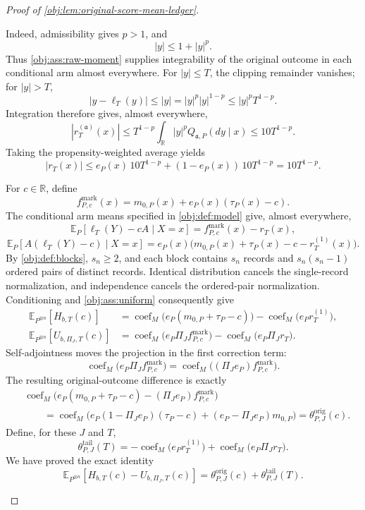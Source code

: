 \documentclass[11pt]{article}
\begin{document}
\begin{proof}[Proof of \cref{obj:lem:original-score-mean-ledger}]
\begin{enumerate}
Indeed, admissibility gives \(p>1\), and
\[
|y|\le1+|y|^p.
\]
Thus \cref{obj:ass:raw-moment} supplies integrability of the original outcome in each conditional arm almost everywhere. For \(|y|\le T\), the clipping remainder vanishes; for \(|y|>T\),
\[
|y-\ell_T(y)|
\le |y|
=|y|^p|y|^{1-p}
\le |y|^pT^{1-p}.
\]
Integration therefore gives, almost everywhere,
\[
|r_T^{(\mathfrak a)}(x)|
\le
T^{1-p}\int_{\mathbb R}|y|^pQ_{\mathfrak a,P}(dy\mid x)
\le10T^{1-p}.
\]
Taking the propensity-weighted average yields
\[
|r_T(x)|
\le e_P(x)\,10T^{1-p}
+(1-e_P(x))\,10T^{1-p}
=10T^{1-p}.
\]

For \(c\in\mathbb R\), define
\[
f^{\mathrm{mark}}_{P,c}(x)
=
m_{0,P}(x)+e_P(x)(\tau_P(x)-c).
\]
The conditional arm means specified in \cref{obj:def:model} give, almost everywhere,
\[
\mathbb E_P[\ell_T(Y)-cA\mid X=x]
=
f^{\mathrm{mark}}_{P,c}(x)-r_T(x),
\]
\[
\mathbb E_P[A(\ell_T(Y)-c)\mid X=x]
=
e_P(x)\bigl(m_{0,P}(x)+\tau_P(x)-c-r_T^{(1)}(x)\bigr).
\]
By \cref{obj:def:blocks}, \(s_n\ge2\), and each block contains \(s_n\) records and \(s_n(s_n-1)\) ordered pairs of distinct records. Identical distribution cancels the single-record normalization, and independence cancels the ordered-pair normalization. Conditioning and
\cref{obj:ass:uniform} consequently give
\[
\begin{aligned}
\mathbb E_{P^{\otimes n}}[H_{b,T}(c)]
&=
\operatorname{coef}_M\bigl(e_P(m_{0,P}+\tau_P-c)\bigr)
-\operatorname{coef}_M\bigl(e_Pr_T^{(1)}\bigr),\\
\mathbb E_{P^{\otimes n}}[U_{b,\Pi_J,T}(c)]
&=
\operatorname{coef}_M\bigl(e_P\Pi_Jf^{\mathrm{mark}}_{P,c}\bigr)
-\operatorname{coef}_M\bigl(e_P\Pi_Jr_T\bigr).
\end{aligned}
\]
Self-adjointness moves the projection in the first correction term:
\[
\operatorname{coef}_M\bigl(e_P\Pi_Jf^{\mathrm{mark}}_{P,c}\bigr)
=
\operatorname{coef}_M\bigl((\Pi_Je_P)f^{\mathrm{mark}}_{P,c}\bigr).
\]
The resulting original-outcome difference is exactly
\[
\begin{aligned}
&\operatorname{coef}_M\bigl(
e_P(m_{0,P}+\tau_P-c)-(\Pi_Je_P)f^{\mathrm{mark}}_{P,c}
\bigr)\\
&\hspace{2em}
=
\operatorname{coef}_M\bigl(
e_P(1-\Pi_Je_P)(\tau_P-c)+(e_P-\Pi_Je_P)m_{0,P}
\bigr)
=
\theta^{\mathrm{orig}}_{P,J}(c).
\end{aligned}
\]
Define, for these \(J\) and \(T\),
\[
\theta^{\mathrm{tail}}_{P,J}(T)
=
-\operatorname{coef}_M\bigl(e_Pr_T^{(1)}\bigr)
+\operatorname{coef}_M\bigl(e_P\Pi_Jr_T\bigr).
\]
We have proved the exact identity
\[
\mathbb E_{P^{\otimes n}}
[H_{b,T}(c)-U_{b,\Pi_J,T}(c)]
=
\theta^{\mathrm{orig}}_{P,J}(c)
+\theta^{\mathrm{tail}}_{P,J}(T).
\]


\end{enumerate}
\end{proof}
\end{document}
